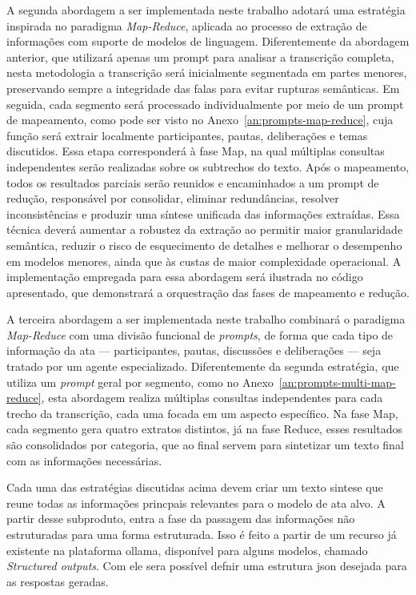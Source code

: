 A segunda abordagem a ser implementada neste trabalho adotará uma estratégia inspirada no paradigma \textit{Map-Reduce}, aplicada ao processo de extração de informações com suporte de modelos de linguagem. Diferentemente da abordagem anterior, que utilizará apenas um prompt para analisar a transcrição completa, nesta metodologia a transcrição será inicialmente segmentada em partes menores, preservando sempre a integridade das falas para evitar rupturas semânticas. Em seguida, cada segmento será processado individualmente por meio de um prompt de mapeamento, como pode ser visto no Anexo~\ref{an:prompts-map-reduce}, cuja função será extrair localmente participantes, pautas, deliberações e temas discutidos. Essa etapa corresponderá à fase Map, na qual múltiplas consultas independentes serão realizadas sobre os subtrechos do texto. Após o mapeamento, todos os resultados parciais serão reunidos e encaminhados a um prompt de redução, responsável por consolidar, eliminar redundâncias, resolver inconsistências e produzir uma síntese unificada das informações extraídas. Essa técnica deverá aumentar a robustez da extração ao permitir maior granularidade semântica, reduzir o risco de esquecimento de detalhes e melhorar o desempenho em modelos menores, ainda que às custas de maior complexidade operacional. A implementação empregada para essa abordagem será ilustrada no código apresentado, que demonstrará a orquestração das fases de mapeamento e redução.

A terceira abordagem a ser implementada neste trabalho combinará o paradigma \textit{Map-Reduce} com uma divisão funcional de \textit{prompts}, de forma que cada tipo de informação da ata — participantes, pautas, discussões e deliberações — seja tratado por um agente especializado. Diferentemente da segunda estratégia, que utiliza um \textit{prompt} geral por segmento, como no Anexo~\ref{an:prompts-multi-map-reduce}, esta abordagem realiza múltiplas consultas independentes para cada trecho da transcrição, cada uma focada em um aspecto específico. Na fase Map, cada segmento gera quatro extratos distintos, já na fase Reduce, esses resultados são consolidados por categoria, que ao final servem para sintetizar um texto final com as informações necessárias.

Cada uma das estratégias discutidas acima devem criar um texto sintese que reune todas as informações princpais relevantes para o modelo de ata alvo. A partir desse subproduto, entra a fase da passagem das informações não estruturadas para uma forma estruturada. Isso é feito a partir de um recurso já existente na plataforma ollama, disponível para alguns modelos, chamado \textit{Structured outputs}. Com ele sera possível defnir uma estrutura json desejada para as respostas geradas.

